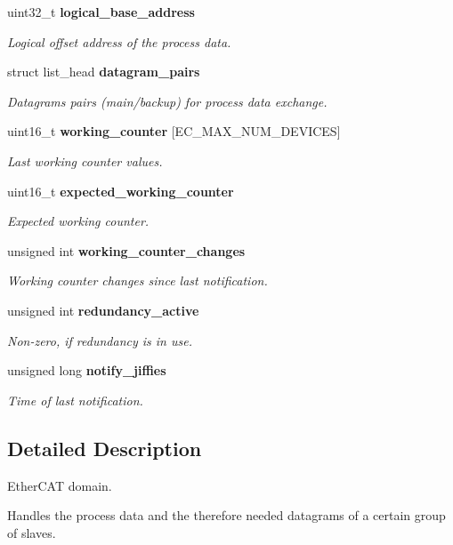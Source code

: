 \begin{DoxyCompactItemize}
uint32\-\_\-t {\bf logical\-\_\-base\-\_\-address}
\begin{DoxyCompactList}\small\item\em Logical offset address of the process data. \end{DoxyCompactList}\item 
struct list\-\_\-head {\bf datagram\-\_\-pairs}
\begin{DoxyCompactList}\small\item\em Datagrams pairs (main/backup) for process data exchange. \end{DoxyCompactList}\item 
uint16\-\_\-t {\bf working\-\_\-counter} [E\-C\-\_\-\-M\-A\-X\-\_\-\-N\-U\-M\-\_\-\-D\-E\-V\-I\-C\-E\-S]
\begin{DoxyCompactList}\small\item\em Last working counter values. \end{DoxyCompactList}\item 
uint16\-\_\-t {\bf expected\-\_\-working\-\_\-counter}
\begin{DoxyCompactList}\small\item\em Expected working counter. \end{DoxyCompactList}\item 
unsigned int {\bf working\-\_\-counter\-\_\-changes}
\begin{DoxyCompactList}\small\item\em Working counter changes since last notification. \end{DoxyCompactList}\item 
unsigned int {\bf redundancy\-\_\-active}
\begin{DoxyCompactList}\small\item\em Non-\/zero, if redundancy is in use. \end{DoxyCompactList}\item 
unsigned long {\bf notify\-\_\-jiffies}
\begin{DoxyCompactList}\small\item\em Time of last notification. \end{DoxyCompactList}\end{DoxyCompactItemize}


\subsection{Detailed Description}
Ether\-C\-A\-T domain. 

Handles the process data and the therefore needed datagrams of a certain group of slaves. 

